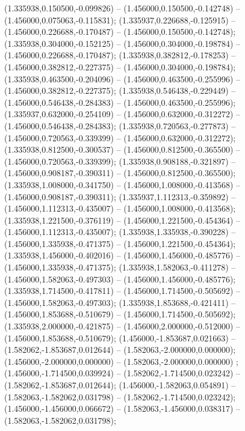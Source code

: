  (1.335938,0.150500,-0.099826) -- (1.456000,0.150500,-0.142748) -- (1.456000,0.075063,-0.115831);
 (1.335937,0.226688,-0.125915) -- (1.456000,0.226688,-0.170487) -- (1.456000,0.150500,-0.142748);
 (1.335938,0.304000,-0.152125) -- (1.456000,0.304000,-0.198784) -- (1.456000,0.226688,-0.170487);
 (1.335938,0.382812,-0.178253) -- (1.456000,0.382812,-0.227375) -- (1.456000,0.304000,-0.198784);
 (1.335938,0.463500,-0.204096) -- (1.456000,0.463500,-0.255996) -- (1.456000,0.382812,-0.227375);
 (1.335938,0.546438,-0.229449) -- (1.456000,0.546438,-0.284383) -- (1.456000,0.463500,-0.255996);
 (1.335937,0.632000,-0.254109) -- (1.456000,0.632000,-0.312272) -- (1.456000,0.546438,-0.284383);
 (1.335938,0.720563,-0.277873) -- (1.456000,0.720563,-0.339399) -- (1.456000,0.632000,-0.312272);
 (1.335938,0.812500,-0.300537) -- (1.456000,0.812500,-0.365500) -- (1.456000,0.720563,-0.339399);
 (1.335938,0.908188,-0.321897) -- (1.456000,0.908187,-0.390311) -- (1.456000,0.812500,-0.365500);
 (1.335938,1.008000,-0.341750) -- (1.456000,1.008000,-0.413568) -- (1.456000,0.908187,-0.390311);
 (1.335937,1.112313,-0.359892) -- (1.456000,1.112313,-0.435007) -- (1.456000,1.008000,-0.413568);
 (1.335938,1.221500,-0.376119) -- (1.456000,1.221500,-0.454364) -- (1.456000,1.112313,-0.435007);
 (1.335938,1.335938,-0.390228) -- (1.456000,1.335938,-0.471375) -- (1.456000,1.221500,-0.454364);
 (1.335938,1.456000,-0.402016) -- (1.456000,1.456000,-0.485776) -- (1.456000,1.335938,-0.471375);
 (1.335938,1.582063,-0.411278) -- (1.456000,1.582063,-0.497303) -- (1.456000,1.456000,-0.485776);
 (1.335938,1.714500,-0.417811) -- (1.456000,1.714500,-0.505692) -- (1.456000,1.582063,-0.497303);
 (1.335938,1.853688,-0.421411) -- (1.456000,1.853688,-0.510679) -- (1.456000,1.714500,-0.505692);
 (1.335938,2.000000,-0.421875) -- (1.456000,2.000000,-0.512000) -- (1.456000,1.853688,-0.510679);
 (1.456000,-1.853687,0.021663) -- (1.582062,-1.853687,0.012644) -- (1.582063,-2.000000,0.000000);
 (1.456000,-2.000000,0.000000) -- (1.582063,-2.000000,0.000000) ;
 (1.456000,-1.714500,0.039924) -- (1.582062,-1.714500,0.023242) -- (1.582062,-1.853687,0.012644);
 (1.456000,-1.582063,0.054891) -- (1.582063,-1.582062,0.031798) -- (1.582062,-1.714500,0.023242);
 (1.456000,-1.456000,0.066672) -- (1.582063,-1.456000,0.038317) -- (1.582063,-1.582062,0.031798);
